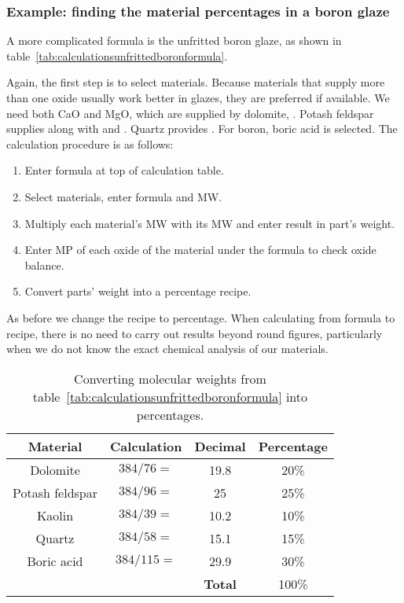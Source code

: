 \subsubsection{Example: finding the material percentages in a boron glaze}
A more complicated formula is the unfritted boron glaze, as shown in 
table~\ref{tab:calculationsunfrittedboronformula}.

Again, the first step is to select materials. Because materials that supply 
more than one oxide usually work better in glazes, they are preferred if 
available. We need both CaO and MgO, which are supplied by dolomite, 
. Potash feldspar supplies  along with  and 
. Quartz provides . For boron, boric acid is selected.
The calculation procedure is as follows:
\begin{enumerate}
\item Enter formula at top of calculation table.
\item Select materials, enter formula and MW.
\item Multiply each material's MW with its MW and enter result in part's weight.
\item Enter MP of each oxide of the material under the formula to check oxide 
balance.
\item Convert parts' weight into a percentage recipe.
\end{enumerate}
As before we change the recipe to percentage. When calculating from formula to 
recipe, there is no need to carry out results beyond round figures, 
particularly when we do not know the exact chemical analysis of our materials.
\begin{center}
  \renewcommand{\arraystretch}{1.5}
  \begin{table}\centering
    \begin{tabular}{|c|c|c|c|}\hline
      \textbf{Material}&\textbf{Calculation}&\textbf{Decimal}&\textbf{Percentage}
      \\\hline\hline
      Dolomite&$384/76=$&19.8&20\%\\\hline
      Potash feldspar&$384/96=$&25&25\%\\\hline
      Kaolin&$384/39=$&10.2&10\%\\\hline
      Quartz&$384/58=$&15.1&15\%\\\hline\hline
      Boric acid&$384/115=$&29.9&30\%\\\hline
      &&\textbf{Total}&100\%\\\hline
    \end{tabular}
    \caption{Converting molecular weights from      
      table~\ref{tab:calculationsunfrittedboronformula} into percentages.}
    \label{tab:glazerecipefromformulatotal}
  \end{table}
\end{center}
